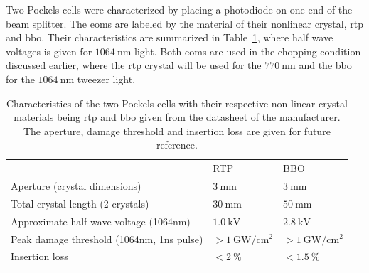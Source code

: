 \begin{figure}[t]%
\end{figure}

Two  Pockels cells were characterized by placing a photodiode on one end of the beam splitter. The \acp{eom} are labeled by the material of their nonlinear crystal, \ac{rtp} and \ac{bbo}. Their characteristics are summarized in Table~\ref{tbl:eom_crystals}, where half wave voltages is given for $\SI{1064}{\nano\meter}$ light. Both \acp{eom} are used in the chopping condition discussed earlier, where the \ac{rtp} crystal will be used for the $\SI{770}{\nano\meter}$ and the \ac{bbo} for the $\SI{1064}{\nano\meter}$ tweezer light.

\begin{table}%
\label{tbl:eom_crystals}
\centering
\begin{tabular}{p{6cm} l l}
	\toprule \toprule
                                                                                     & RTP                                       & BBO \\ \thickhline%
Aperture (crystal dimensions)                                                        & $\SI{3}{\milli\meter}$                    & $\SI{3}{\milli\meter}$   \\ \midrule
Total crystal length (2 crystals)                                                    & $\SI{30}{\milli\meter}$                   & $\SI{50}{\milli\meter}$    \\ \midrule
Approximate half wave voltage \newline (1064nm)    & $\SI{1.0}{\kilo \volt}$                   & $\SI{2.8}{\kilo\volt}$    \\ \midrule
Peak damage threshold (1064nm, \newline 1ns pulse) & $> \SI{1}{\giga \watt \per \cm \squared}$ & $> \SI{1}{\giga \watt \per \cm \squared}$   \\ \midrule
Insertion loss                                                                       & $< \SI{2}{\percent}$                      & $< \SI{1.5}{\percent} $ \\ \bottomrule \bottomrule
\end{tabular}
\caption{Characteristics of the two Pockels cells with their respective non-linear crystal materials being \ac{rtp} and \ac{bbo} given from the datasheet of the manufacturer. The aperture, damage threshold and insertion loss are given for future reference.}
\end{table}

